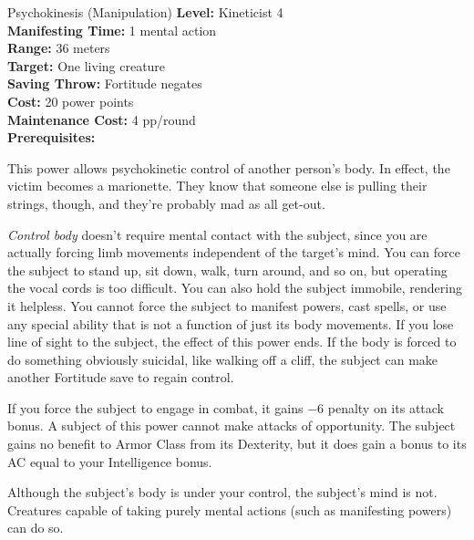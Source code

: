 {Psychokinesis (Manipulation)}
{
	\textbf{Level:}
	Kineticist 4\\
	\textbf{Manifesting Time:}
	1 mental action\\
	\textbf{Range:}
	36 meters\\
	\textbf{Target:}
	One living creature\\
	\textbf{Saving Throw:}
	Fortitude negates\\
	\textbf{Cost:}
	20 power points\\
	\textbf{Maintenance Cost:}
	4 pp/round\\
	\textbf{Prerequisites:}
	\\
}
{
	This power allows psychokinetic control of another person's body. In effect, the victim becomes a marionette. They know that someone else is pulling their strings, though, and they're probably mad as all get-out.

	\emph{Control body} doesn't require mental contact with the subject, since you are actually forcing limb movements independent of the target's mind. You can force the subject to stand up, sit down, walk, turn around, and so on, but operating the vocal cords is too difficult. You can also hold the subject immobile, rendering it helpless. You cannot force the subject to manifest powers, cast spells, or use any special ability that is not a function of just its body movements. If you lose line of sight to the subject, the effect of this power ends. If the body is forced to do something obviously suicidal, like walking off a cliff, the subject can make another Fortitude save to regain control.

	If you force the subject to engage in combat, it gains $-6$ penalty on its attack bonus. A subject of this power cannot make attacks of opportunity. The subject gains no benefit to Armor Class from its Dexterity, but it does gain a bonus to its AC equal to your Intelligence bonus.

	Although the subject's body is under your control, the subject's mind is not. Creatures capable of taking purely mental actions (such as manifesting powers) can do so.
}